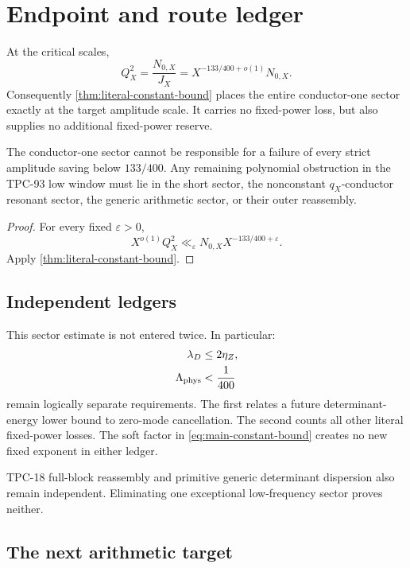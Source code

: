 \section{Endpoint and route ledger}
\label{sec:endpoint-ledger}

At the critical scales,
\[
 Q_X^2
 =\frac{N_{0,X}}{J_X}
 =X^{-133/400+o(1)}N_{0,X}.
\]
Consequently \cref{thm:literal-constant-bound} places the entire
conductor-one sector exactly at the target amplitude scale.  It carries
no fixed-power loss, but also supplies no additional fixed-power
reserve.

\begin{corollary}
\label{cor:constant-removed}
The conductor-one sector cannot be responsible for a failure of
every strict amplitude saving below \(133/400\).  Any remaining
polynomial obstruction in the TPC-93 low window must lie in the
short sector, the nonconstant \(q_X\)-conductor resonant sector, the
generic arithmetic sector, or their outer reassembly.
\end{corollary}

\begin{proof}
For every fixed \(\varepsilon>0\),
\[
 X^{o(1)}Q_X^2
 \ll_\varepsilon
 N_{0,X}X^{-133/400+\varepsilon}.
\]
Apply \cref{thm:literal-constant-bound}.
\end{proof}

\subsection{Independent ledgers}

This sector estimate is not entered twice.  In particular:
\begin{align}
 \lambda_D&\le2\eta_Z,
\label{eq:determinant-ledger}\\
 \Lambda_{\rm phys}&<\frac1{400}
\label{eq:physical-ledger}
\end{align}
remain logically separate requirements.  The first relates a future
determinant-energy lower bound to zero-mode cancellation.  The
second counts all other literal fixed-power losses.  The soft factor
in \eqref{eq:main-constant-bound} creates no new fixed exponent in
either ledger.

TPC-18 full-block reassembly and primitive generic determinant
dispersion also remain independent.  Eliminating one exceptional
low-frequency sector proves neither.

\subsection{The next arithmetic target}

